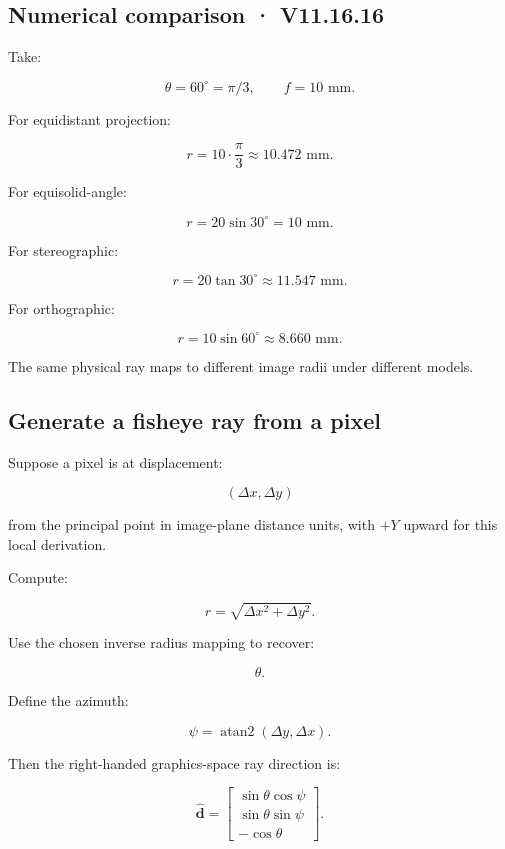\subsection{Numerical comparison · V11.16.16}\label{02-foundations-ii-ch035-numerical-comparison-v11.16.16}

Take:

\[ \theta=60^\circ=\pi/3, \qquad f=10\text{ mm}. \]

For equidistant projection:

\[ r=10\cdot\frac\pi3 \approx\boxed{10.472\text{ mm}}. \]

For equisolid-angle:

\[ r=20\sin30^\circ =\boxed{10\text{ mm}}. \]

For stereographic:

\[ r=20\tan30^\circ \approx\boxed{11.547\text{ mm}}. \]

For orthographic:

\[ r=10\sin60^\circ \approx\boxed{8.660\text{ mm}}. \]

The same physical ray maps to different image radii under different models.

\subsection{Generate a fisheye ray from a pixel}\label{02-foundations-ii-ch035-generate-a-fisheye-ray-from-a-pixel}

Suppose a pixel is at displacement:

\[ (\Delta x,\Delta y) \]

from the principal point in image-plane distance units, with \(+Y\) upward for this local derivation.

Compute:

\[ r=\sqrt{\Delta x^2+\Delta y^2}. \]

Use the chosen inverse radius mapping to recover:

\[ \theta. \]

Define the azimuth:

\[ \psi=\operatorname{atan2}(\Delta y,\Delta x). \]

Then the right-handed graphics-space ray direction is:

\[ \boxed{ \hat{\mathbf d}= \begin{bmatrix} \sin\theta\cos\psi\\ \sin\theta\sin\psi\\ -\cos\theta \end{bmatrix}. } \]

